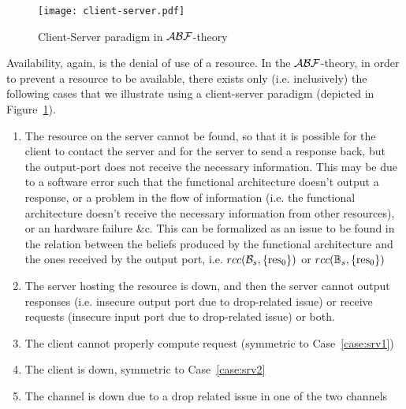\begin{figure}[t]
	\centering
	\texttt{[image: client-server.pdf]}
	\caption{Client-Server paradigm in $\mathcal{A}\mathcal{B}\mathcal{F}$-theory}
	\label{fig:client-server}
\end{figure}
Availability, again, is the denial of use of a resource. In the $\mathcal{A}\mathcal{B}\mathcal{F}$-theory, 
in order to prevent a resource to be available, there
exists only (i.e. inclusively) the following cases
that we illustrate using a client-server paradigm (depicted in Figure~\ref{fig:client-server}).
\begin{enumerate}
	\item\label{case:srv1} The resource on the server cannot be found, so that it is
		possible for the client to contact the server and for the server
		to send a response back, but the output-port does not receive the
		necessary information. This may be due to a software error such
		that the functional architecture doesn't output a response, or
		a problem in the flow of information (i.e. the functional
		architecture doesn't receive the necessary information from
		other resources), or an hardware failure \&c. This can be formalized
		as an issue to be found in the relation between the beliefs produced by the functional
		architecture and the ones received by the output port, i.e.
		$rcc(\mathcal{B}_s,\{\text{res}_0\})$ or 
		$rcc(\mathbb{B}_s,\{\text{res}_0\})$ 
	\item\label{case:srv2} The server hosting the resource is down, and then the server
		cannot output responses (i.e. insecure output port due to drop-related issue) or receive
		requests (insecure input port due to drop-related issue) or both.
	\item\label{case:srv3} The client cannot properly compute request (symmetric to Case~\ref{case:srv1})
	\item The client is down, symmetric to Case~\ref{case:srv2}
	\item The channel is down due to a drop related issue in one of the two channels 
\end{enumerate}
